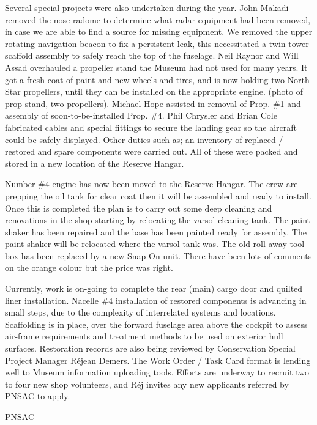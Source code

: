 Several special projects were also undertaken during the year.  John
Makadi removed the nose radome to determine what radar equipment had
been removed, in case we are able to find a source for missing
equipment.  We removed the upper rotating navigation beacon to fix a
persistent leak, this necessitated a twin tower scaffold assembly to
safely reach the top of the fuselage. Neil Raynor and Will Assad
overhauled a propeller stand the Museum had not used for many years. 
It got a fresh coat of paint and new wheels and tires, and is now
holding two North Star propellers, until they can be installed on the
appropriate engine. (photo of prop stand, two propellers). Michael Hope
assisted in removal of Prop. \#1 and assembly of soon-to-be-installed
Prop. \#4. Phil Chrysler and Brian Cole fabricated cables and special
fittings to secure the landing gear so the aircraft could be safely
displayed. Other duties  such as; an inventory of replaced / restored
and spare components were carried out.  All of these were packed and
stored in a new location of the Reserve Hangar.

Number \#4 engine has now  been moved to the Reserve Hangar. The crew
are prepping the oil tank for clear coat then it will be assembled and
ready to install. Once this is completed  the plan is to carry out some
deep cleaning and renovations in the shop starting  by  relocating the
varsol cleaning tank. The paint shaker has been repaired and the base
has been painted ready for assembly. The paint shaker will be relocated
where the varsol tank was. The old roll away tool box has been replaced
by a new Snap-On unit. There have been lots of comments on the orange
colour  but the price was right.

Currently, work is on-going to complete the rear (main) cargo door and
quilted liner installation. Nacelle \#4 installation of restored
components is advancing in small steps, due to the complexity of
interrelated systems and locations. Scaffolding is in place, over the
forward fuselage area above the cockpit to assess air-frame
requirements and treatment methods to be used on exterior hull
surfaces. Restoration records are also being reviewed by Conservation
Special Project Manager Réjean Demers. The Work Order / Task Card
format is lending well to Museum information uploading tools. Efforts
are underway to recruit two to four new shop volunteers, and R\'{e}j
invites any new applicants referred by PNSAC to apply.

\begin{footnotesize}
  \raggedleft PNSAC\\
\end{footnotesize}



